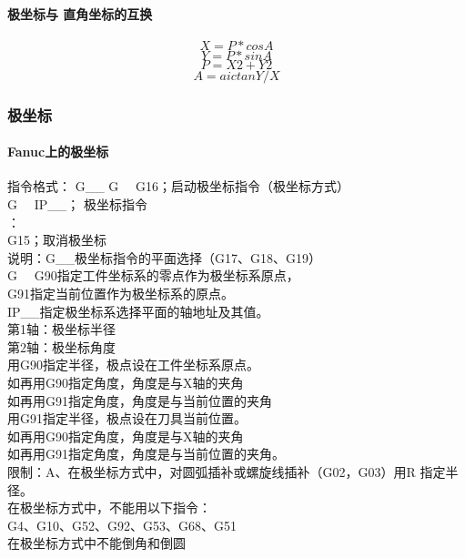 \paragraph{极坐标与 直角坐标的互换}
$$X=P*cosA$$
$$Y=P*sinA$$
$$P=X2+Y2$$
$$A=aictanY/X$$
\subsubsection{极坐标}
\paragraph{Fanuc上的极坐标}
指令格式： G\_\_ G~~ G16；启动极坐标指令（极坐标方式）\\
G~~ IP\_\_； 极坐标指令\\
：\\
G15；取消极坐标\\
说明：G\_\_极坐标指令的平面选择（G17、G18、G19）\\
G~~ G90指定工件坐标系的零点作为极坐标系原点，\\
G91指定当前位置作为极坐标系的原点。\\
IP\_\_指定极坐标系选择平面的轴地址及其值。\\
第1轴：极坐标半径\\
第2轴：极坐标角度 \\
用G90指定半径，极点设在工件坐标系原点。\\
如再用G90指定角度，角度是与X轴的夹角\\
如再用G91指定角度，角度是与当前位置的夹角\\
用G91指定半径，极点设在刀具当前位置。\\
如再用G90指定角度，角度是与X轴的夹角\\
如再用G91指定角度，角度是与当前位置的夹角。\\
限制：A、在极坐标方式中，对圆弧插补或螺旋线插补（G02，G03）用R 指定半径。\\
在极坐标方式中，不能用以下指令：\\
G4、G10、G52、G92、G53、G68、G51\\
在极坐标方式中不能倒角和倒圆\\
